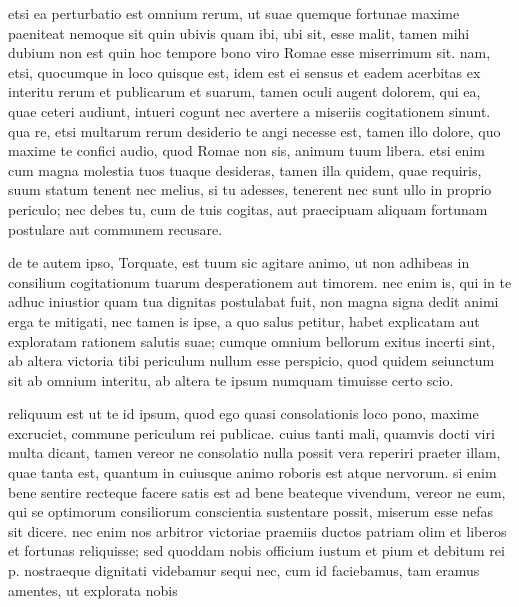 


 etsi ea perturbatio est omnium rerum, ut suae quemque fortunae maxime paeniteat nemoque sit quin ubivis quam ibi, ubi sit, esse malit, tamen mihi dubium non est quin hoc tempore bono viro Romae esse miserrimum sit. nam, etsi, quocumque in loco quisque est, idem est ei sensus et eadem acerbitas ex interitu rerum et publicarum et suarum, tamen oculi augent dolorem, qui ea, quae ceteri audiunt, intueri cogunt nec avertere a miseriis cogitationem sinunt. qua re, etsi multarum rerum desiderio te angi necesse est, tamen illo dolore, quo maxime te confici audio, quod Romae non sis, animum tuum libera. etsi enim cum magna molestia tuos tuaque desideras, tamen illa quidem, quae requiris, suum statum tenent nec melius, si tu adesses, tenerent nec sunt ullo in proprio periculo; nec debes tu, cum de tuis cogitas, aut praecipuam aliquam fortunam postulare aut communem recusare.

 de te autem ipso, Torquate, est tuum sic agitare animo, ut non adhibeas in consilium cogitationum tuarum desperationem aut timorem. nec enim is, qui in te adhuc iniustior quam tua dignitas postulabat fuit, non magna signa dedit animi erga te mitigati, nec tamen is ipse, a quo salus petitur, habet explicatam aut exploratam rationem salutis suae; cumque omnium bellorum exitus incerti sint, ab altera victoria tibi periculum nullum esse perspicio, quod quidem seiunctum sit ab omnium interitu, ab altera te ipsum numquam timuisse certo scio.

 reliquum est ut te id ipsum, quod ego quasi consolationis loco pono, maxime excruciet, commune periculum rei publicae. cuius tanti mali, quamvis docti viri multa dicant, tamen vereor ne consolatio nulla possit vera reperiri praeter illam, quae tanta est, quantum in cuiusque animo roboris est atque nervorum. si enim bene sentire recteque facere satis est ad bene beateque vivendum, vereor ne eum, qui se optimorum consiliorum conscientia sustentare possit, miserum esse nefas sit dicere. nec enim nos arbitror victoriae praemiis ductos patriam olim et liberos et fortunas reliquisse; sed quoddam nobis officium iustum et pium et debitum rei p. nostraeque dignitati videbamur sequi nec, cum id faciebamus, tam eramus amentes, ut explorata nobis

